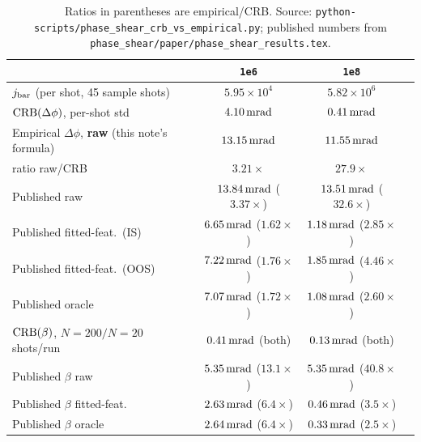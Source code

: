 \documentclass[11pt,a4paper]{article}
\newcommand{\code}[1]{\texttt{#1}}
\begin{document}
\begin{table}[h]
\centering\small
\begin{tabular}{lccc}
\toprule
& \code{1e6} & \code{1e8} \\
\midrule
$j_{\rm bar}$ (per shot, 45 sample shots) & $5.95\times10^4$ & $5.82\times10^6$ \\
${\rm CRB}(\Delta\phi)$, per-shot std & $4.10\,{\rm mrad}$ & $0.41\,{\rm mrad}$ \\
Empirical $\Delta\phi$, \textbf{raw} (this note's formula) & $13.15\,{\rm mrad}$ & $11.55\,{\rm mrad}$ \\
\quad ratio raw/CRB & $3.21\times$ & $27.9\times$ \\
\midrule
Published raw & $13.84\,{\rm mrad}$ ($3.37\times$) & $13.51\,{\rm mrad}$ ($32.6\times$) \\
Published fitted-feat.\ (IS) & $6.65\,{\rm mrad}$ ($1.62\times$) & $1.18\,{\rm mrad}$ ($2.85\times$) \\
Published fitted-feat.\ (OOS) & $7.22\,{\rm mrad}$ ($1.76\times$) & $1.85\,{\rm mrad}$ ($4.46\times$) \\
Published oracle & $7.07\,{\rm mrad}$ ($1.72\times$) & $1.08\,{\rm mrad}$ ($2.60\times$) \\
\midrule
${\rm CRB}(\beta)$, $N{=}200/N{=}20$ shots/run & $0.41\,{\rm mrad}$ (both) & $0.13\,{\rm mrad}$ (both) \\
Published $\beta$ raw & $5.35\,{\rm mrad}$ ($13.1\times$) & $5.35\,{\rm mrad}$ ($40.8\times$) \\
Published $\beta$ fitted-feat.\ & $2.63\,{\rm mrad}$ ($6.4\times$) & $0.46\,{\rm mrad}$ ($3.5\times$) \\
Published $\beta$ oracle & $2.64\,{\rm mrad}$ ($6.4\times$) & $0.33\,{\rm mrad}$ ($2.5\times$) \\
\bottomrule
\end{tabular}
\caption{Ratios in parentheses are empirical/CRB. Source:
\code{python-scripts/phase\_shear\_crb\_vs\_empirical.py}; published numbers
from \code{phase\_shear/paper/phase\_shear\_results.tex}.}
\end{table}
\end{document}
